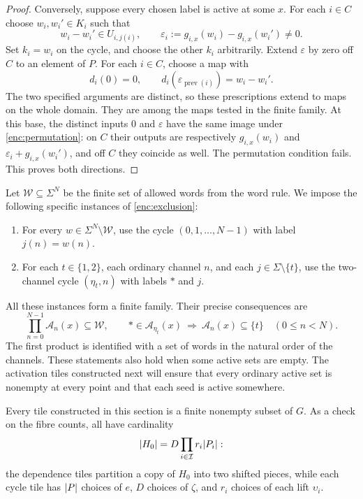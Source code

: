 \begin{proof}
Conversely, suppose every chosen label is active at some $x$.
For each $i\in C$ choose $w_i,w_i'\in K_i$ such that
\[
 w_i-w_i'\in U_{i,j(i)},\qquad
 \varepsilon_i:=g_{i,x}(w_i)-g_{i,x}(w_i')\ne0.
\]
Set $k_i=w_i$ on the cycle, and choose the other $k_i$ arbitrarily.
Extend $\varepsilon$ by zero off $C$ to an element of $P$.
For each $i\in C$, choose a map with
\[
 d_i(0)=0,\qquad
 d_i(\varepsilon_{\operatorname{prev}(i)})=w_i-w_i'.
\]
The two specified arguments are distinct, so these prescriptions
extend to maps on the whole domain.  They are among the maps tested
in the finite family.  At this base, the distinct inputs $0$ and
$\varepsilon$ have the same image under \eqref{enc:permutation}:
on $C$ their outputs are respectively $g_{i,x}(w_i)$ and
$\varepsilon_i+g_{i,x}(w_i')$, and off $C$ they coincide as well.
The permutation condition fails.  This proves both directions.
\end{proof}

Let $\mathcal W\subseteq\Sigma^N$ be the finite set of allowed words
from the word rule.  We impose the following specific instances of
\cref{enc:exclusion}:
\begin{enumerate}
 \item For every $w\in\Sigma^N\setminus\mathcal W$, use the cycle
 $(0,1,\ldots,N-1)$ with label $j(n)=w(n)$.
 \item For each $t\in\{1,2\}$, each ordinary channel $n$, and each
 $j\in\Sigma\setminus\{t\}$, use the two-channel cycle
 $(\eta_t,n)$ with labels $*$ and $j$.
\end{enumerate}
All these instances form a finite family.  Their precise consequences
are
\begin{equation}
 \prod_{n=0}^{N-1}\mathcal A_n(x)\subseteq\mathcal W,
 \qquad
 *\in\mathcal A_{\eta_t}(x)
   \ \Longrightarrow\ 
   \mathcal A_n(x)\subseteq\{t\}\quad(0\leq n<N).
 \label{enc:word-exclusions}
\end{equation}
The first product is identified with a set of words in the natural
order of the channels.  These statements also hold when some active
sets are empty.  The activation tiles constructed next will ensure
that every ordinary active set is nonempty at every point and that
each seed is active somewhere.

Every tile constructed in this section is a finite nonempty subset
of $G$.  As a check on the fibre counts, all have cardinality
\[
 \lvert H_0\rvert=D\prod_{i\in\mathcal I}r_i\lvert P_i\rvert:
\]
the dependence tiles partition a copy of $H_0$ into two shifted
pieces, while each cycle tile has $\lvert P\rvert$ choices of $e$, $D$
choices of $\zeta$, and $r_i$ choices of each lift $\upsilon_i$.
